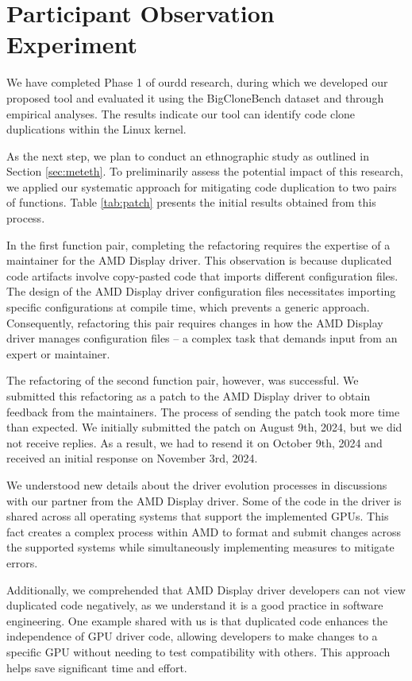 \en

\section{Participant Observation Experiment}

We have completed Phase 1 of ourdd research, during which we developed our proposed tool and evaluated it using the BigCloneBench dataset and through empirical analyses. The results indicate our tool can identify code clone duplications within the Linux kernel.

As the next step, we plan to conduct an ethnographic study as outlined in Section \ref{sec:meteth}. To preliminarily assess the potential impact of this research, we applied our systematic approach for mitigating code duplication to two pairs of functions. Table \ref{tab:patch} presents the initial results obtained from this process.



In the first function pair, completing the refactoring requires the expertise of a maintainer for the AMD Display driver. This observation is because duplicated code artifacts involve copy-pasted code that imports different configuration files. The design of the AMD Display driver configuration files necessitates importing specific configurations at compile time, which prevents a generic approach. Consequently, refactoring this pair requires changes in how the AMD Display driver manages configuration files -- a complex task that demands input from an expert or maintainer.

The refactoring of the second function pair, however, was successful. We submitted this refactoring as a patch to the AMD Display driver to obtain feedback from the maintainers. The process of sending the patch took more time than expected. We initially submitted the patch on August 9th, 2024, but we did not receive replies. As a result, we had to resend it on October 9th, 2024 and received an initial response on November 3rd, 2024. 

We understood new details about the driver evolution processes in discussions with our partner from the AMD Display driver. Some of the code in the driver is shared across all operating systems that support the implemented GPUs. This fact creates a complex process within AMD to format and submit changes across the supported systems while simultaneously implementing measures to mitigate errors.

Additionally, we comprehended that AMD Display driver developers can not view duplicated code negatively, as we understand it is a good practice in software engineering. One example shared with us is that duplicated code enhances the independence of GPU driver code, allowing developers to make changes to a specific GPU without needing to test compatibility with others. This approach helps save significant time and effort. 

